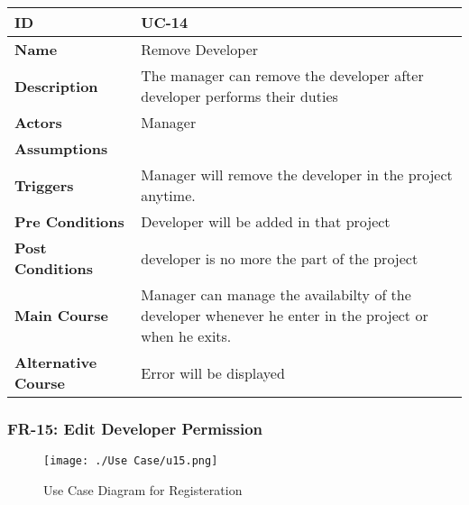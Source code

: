     \begin{center}
        \begin{tabularx}{\textwidth}{|l|X|}
            \hline
            \textbf{ID} & UC-14 \\
            \hline
            \textbf{Name} & Remove Developer \\
            \hline
            \textbf{Description} & The manager can remove the developer after developer performs their duties \\
            \hline
            \textbf{Actors} & Manager \\
            \hline
            \textbf{Assumptions} &  \\
            \hline
            \textbf{Triggers} & Manager will remove the developer in the project anytime. \\
            \hline
            \textbf{Pre Conditions} & Developer will be added in that project \\
            \hline
            \textbf{Post Conditions} & developer is no more the part of the project \\
            \hline
            \textbf{Main Course} & Manager can manage the availabilty of the developer whenever he enter in the project or when he exits. \\
            \hline
            \textbf{Alternative Course} & Error will be displayed \\
            \hline
            
        \end{tabularx}
    \end{center}
    \newpage
    

    \subsubsection{FR-15: Edit Developer Permission}
    \begin{figure}[H]
        \texttt{[image: ./Use Case/u15.png]}
        \centering 
        \caption{Use Case Diagram for Registeration}
        \label{fig:prototype1}
        \end{figure}
        
